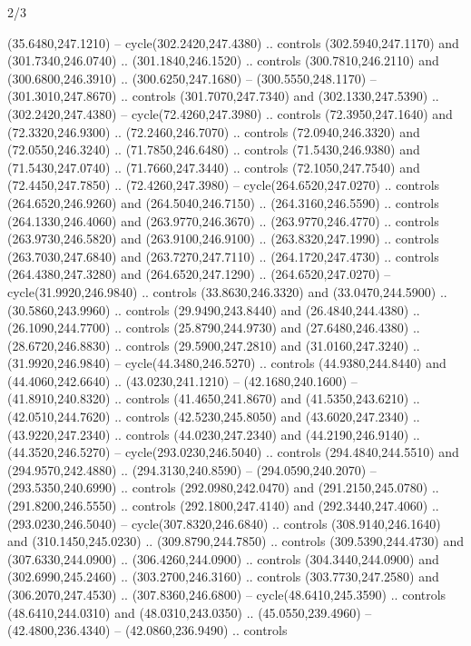 \begin{flagdescription}{2/3}
\begin{scope}[xshift=0.5\flaglength,yshift=0.5\flagwidth,scale=\stretchfactor]
\begin{scope}[scale=0.001645\flagwidth,yshift=65mm,xshift=-63mm]
\begin{scope}[y=0.80pt, x=0.80pt, yscale=-1,]
\begin{scope}[cm={{1.33333,0.0,0.0,1.33333,(0.0,1e-05)}}]
  (35.6480,247.1210) -- cycle(302.2420,247.4380) .. controls (302.5940,247.1170)
  and (301.7340,246.0740) .. (301.1840,246.1520) .. controls (300.7810,246.2110)
  and (300.6800,246.3910) .. (300.6250,247.1680) -- (300.5550,248.1170) --
  (301.3010,247.8670) .. controls (301.7070,247.7340) and (302.1330,247.5390) ..
  (302.2420,247.4380) -- cycle(72.4260,247.3980) .. controls (72.3950,247.1640)
  and (72.3320,246.9300) .. (72.2460,246.7070) .. controls (72.0940,246.3320)
  and (72.0550,246.3240) .. (71.7850,246.6480) .. controls (71.5430,246.9380)
  and (71.5430,247.0740) .. (71.7660,247.3440) .. controls (72.1050,247.7540)
  and (72.4450,247.7850) .. (72.4260,247.3980) -- cycle(264.6520,247.0270) ..
  controls (264.6520,246.9260) and (264.5040,246.7150) .. (264.3160,246.5590) ..
  controls (264.1330,246.4060) and (263.9770,246.3670) .. (263.9770,246.4770) ..
  controls (263.9730,246.5820) and (263.9100,246.9100) .. (263.8320,247.1990) ..
  controls (263.7030,247.6840) and (263.7270,247.7110) .. (264.1720,247.4730) ..
  controls (264.4380,247.3280) and (264.6520,247.1290) .. (264.6520,247.0270) --
  cycle(31.9920,246.9840) .. controls (33.8630,246.3320) and (33.0470,244.5900)
  .. (30.5860,243.9960) .. controls (29.9490,243.8440) and (26.4840,244.4380) ..
  (26.1090,244.7700) .. controls (25.8790,244.9730) and (27.6480,246.4380) ..
  (28.6720,246.8830) .. controls (29.5900,247.2810) and (31.0160,247.3240) ..
  (31.9920,246.9840) -- cycle(44.3480,246.5270) .. controls (44.9380,244.8440)
  and (44.4060,242.6640) .. (43.0230,241.1210) -- (42.1680,240.1600) --
  (41.8910,240.8320) .. controls (41.4650,241.8670) and (41.5350,243.6210) ..
  (42.0510,244.7620) .. controls (42.5230,245.8050) and (43.6020,247.2340) ..
  (43.9220,247.2340) .. controls (44.0230,247.2340) and (44.2190,246.9140) ..
  (44.3520,246.5270) -- cycle(293.0230,246.5040) .. controls (294.4840,244.5510)
  and (294.9570,242.4880) .. (294.3130,240.8590) -- (294.0590,240.2070) --
  (293.5350,240.6990) .. controls (292.0980,242.0470) and (291.2150,245.0780) ..
  (291.8200,246.5550) .. controls (292.1800,247.4140) and (292.3440,247.4060) ..
  (293.0230,246.5040) -- cycle(307.8320,246.6840) .. controls
  (308.9140,246.1640) and (310.1450,245.0230) .. (309.8790,244.7850) .. controls
  (309.5390,244.4730) and (307.6330,244.0900) .. (306.4260,244.0900) .. controls
  (304.3440,244.0900) and (302.6990,245.2460) .. (303.2700,246.3160) .. controls
  (303.7730,247.2580) and (306.2070,247.4530) .. (307.8360,246.6800) --
  cycle(48.6410,245.3590) .. controls (48.6410,244.0310) and (48.0310,243.0350)
  .. (45.0550,239.4960) -- (42.4800,236.4340) -- (42.0860,236.9490) .. controls

\end{scope}
\end{scope}
\end{scope}
\end{scope}
\end{flagdescription}
